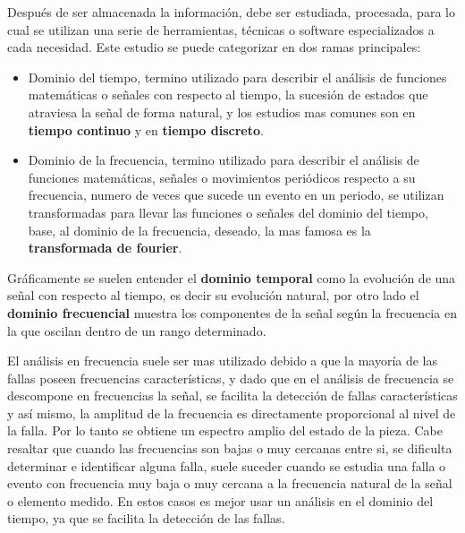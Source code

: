 Después de ser almacenada la información, debe ser estudiada, procesada, para lo
cual se utilizan una serie de herramientas, técnicas o software especializados
a cada necesidad. Este estudio se puede categorizar en dos ramas principales:

\begin{itemize}
    \item Dominio del tiempo, termino utilizado para describir el análisis
        de funciones matemáticas o señales con respecto al tiempo, la sucesión
        de estados que atraviesa la señal de forma natural, y los estudios mas
        comunes son en  \textbf{tiempo continuo} y en \textbf{tiempo discreto}.

    \item Dominio de la frecuencia, termino utilizado para describir el análisis
        de funciones matemáticas, señales o movimientos periódicos respecto a
        su frecuencia, numero de veces que sucede un evento en un periodo, se
        utilizan transformadas para llevar las funciones o señales del dominio
        del tiempo, base, al dominio de la frecuencia, deseado, la mas famosa es
        la \textbf{transformada de fourier}.
\end{itemize}


Gráficamente se suelen entender el \textbf{dominio temporal} como la evolución
de una señal con respecto al tiempo, es decir su evolución natural, por otro
lado el \textbf{dominio frecuencial} muestra los componentes de la señal según
la frecuencia en la que oscilan dentro de un rango determinado.



El análisis en frecuencia suele ser mas utilizado debido a que
la mayoría de las fallas poseen frecuencias características, y dado que en  el
análisis de frecuencia se descompone en frecuencias la señal, se facilita la
detección de fallas características y así mismo, la amplitud de la frecuencia es
directamente proporcional al nivel de la falla. Por lo tanto se obtiene un
espectro amplio del estado de la pieza.
Cabe resaltar que cuando las frecuencias son bajas o muy cercanas entre si,
se dificulta determinar e identificar alguna falla, suele suceder cuando se
estudia una falla o evento con frecuencia muy baja o muy cercana a la frecuencia
natural de la señal o elemento medido. En estos casos es mejor
usar un análisis en el dominio del tiempo, ya que se facilita la
detección de las fallas.



